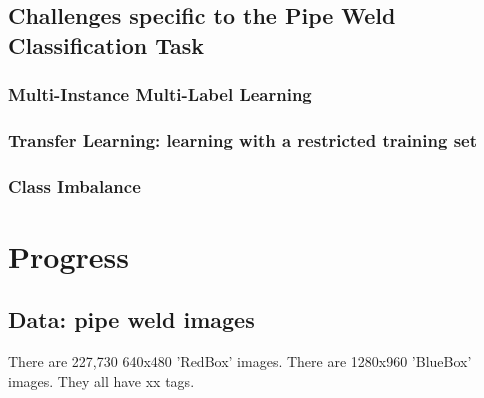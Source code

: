 \documentclass[a4paper,11pt]{article}
\begin{document}
\subsection{Challenges specific to the Pipe Weld Classification Task}

\subsubsection{Multi-Instance Multi-Label Learning}

\subsubsection{Transfer Learning: learning with a restricted training set}

\subsubsection{Class Imbalance}

\clearpage



\clearpage
\section{Progress}

\subsection{Data: pipe weld images}
There are 227,730 640x480 'RedBox' images. There are 1280x960 'BlueBox' images. They all have xx tags.
\end{document}
